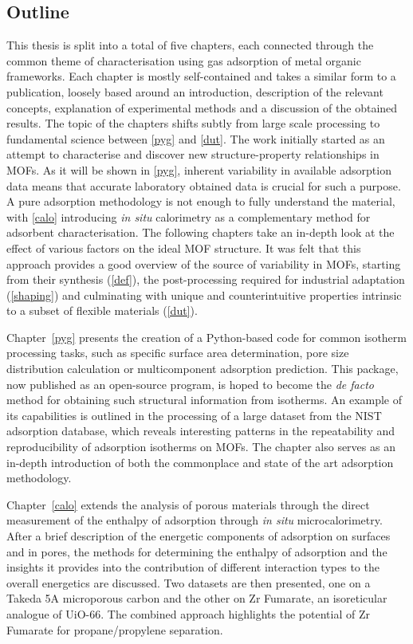 \subsection*{Outline}

This thesis is split into a total of five chapters, each
connected through the common theme of characterisation 
using gas adsorption of metal organic frameworks. 
Each chapter is mostly 
self-contained and takes a similar form to a publication,
loosely based around an introduction, description of the 
relevant concepts, explanation of experimental methods and
a discussion of the obtained results. 
The topic of the chapters 
shifts subtly from large scale processing to fundamental
science between \autoref{pyg} and \autoref{dut}.
The work initially started as an attempt to characterise and
discover new structure-property relationships in \glspl{MOF}.
As it will be shown in \autoref{pyg}, inherent variability
in available adsorption data means that accurate laboratory
obtained data is crucial for such a purpose. A pure adsorption
methodology is not enough to fully understand the material,
with \autoref{calo} introducing \textit{in situ} calorimetry
as a complementary method for adsorbent characterisation.
The following chapters take an in-depth look at the effect of 
various factors on the ideal \gls{MOF} structure.
It was felt that this approach provides a good overview of the source of 
variability in \glspl{MOF}, starting from their synthesis
(\autoref{def}), the post-processing required for industrial
adaptation (\autoref{shaping}) and culminating with 
unique and counterintuitive properties intrinsic to a subset 
of flexible materials (\autoref{dut}).

Chapter~\ref{pyg} presents the creation of a Python-based code for
common isotherm processing tasks, such as specific surface area 
determination, pore size distribution calculation or multicomponent 
adsorption prediction. This package, now published as an 
open-source program, is hoped to become the \textit{de facto}
method for obtaining such structural information from isotherms. 
An example of its capabilities is outlined in the processing of 
a large dataset from the \gls{NIST} adsorption database, which reveals 
interesting patterns in the repeatability and reproducibility of 
adsorption isotherms on \glspl{MOF}. The chapter also serves as an in-depth
introduction of both the commonplace and state of the art adsorption methodology.

Chapter~\ref{calo} extends the analysis of porous materials through
the direct measurement of the enthalpy of adsorption through 
\textit{in situ} microcalorimetry. After a brief description 
of the energetic components of adsorption on surfaces
and in pores, the methods for determining the enthalpy of 
adsorption and the insights it provides into the contribution
of different interaction types to the overall energetics are 
discussed. Two datasets are then presented, one on a 
Takeda 5A microporous carbon and the other on Zr Fumarate,
an isoreticular analogue of UiO-66. The combined approach
highlights the potential of Zr Fumarate for propane/propylene separation.


